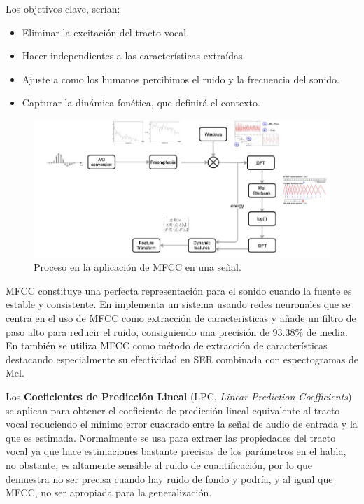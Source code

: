 \documentclass[11pt,a4paper,spanish]{book}
\begin{document}
	Los objetivos clave, serían:
	\begin{itemize}
		\item Eliminar la excitación del tracto vocal.
		\item Hacer independientes a las características extraídas.
		\item Ajuste a como los humanos percibimos el ruido y la frecuencia del sonido.
		\item Capturar la dinámica fonética, que definirá el contexto.
	\end{itemize}

	\begin{figure}[H]
		\centering
		\includegraphics[scale=0.25]{MFCC_process.jpeg} 
		\caption{Proceso en la aplicación de MFCC en una señal.}
		\label{fig:mfcc_process}
	\end{figure}

	 MFCC constituye una perfecta representación para el sonido cuando la fuente es estable y consistente. En \cite{Sarkania2013} implementa un sistema usando redes neuronales que se centra en el uso de MFCC como extracción de características y añade un filtro  de paso alto para reducir el ruido, consiguiendo una precisión de 93.38\% de media. En \cite{Wang2020} también se utiliza MFCC como método de extracción de características destacando especialmente su efectividad en SER combinada con espectogramas de Mel.\hfill \break
	 
	
	Los \textbf{Coeficientes de Predicción Lineal} (LPC, \emph{Linear Prediction Coefficients}) se aplican para obtener el coeficiente de predicción lineal equivalente al tracto vocal reduciendo el mínimo error cuadrado entre la señal de audio de entrada y la que es estimada. Normalmente se usa para extraer las propiedades del tracto vocal ya que hace estimaciones bastante precisas de los parámetros en el habla, no obstante, es altamente sensible al ruido de cuantificación, por lo que demuestra no ser precisa cuando hay ruido de fondo y podría, y al igual que MFCC, no ser apropiada para la generalización.\hfill \break
	
\end{document}
